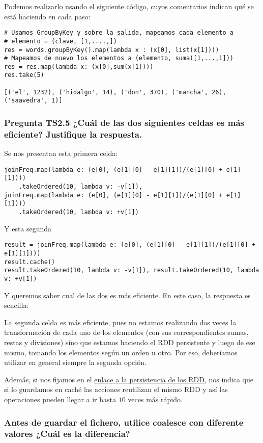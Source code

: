 \documentclass[11pt]{article}
\begin{document}
Podemos realizarlo usando el siguiente código, cuyos comentarios indican qué se está haciendo en cada paso:  

\begin{verbatim}
# Usamos GroupByKey y sobre la salida, mapeamos cada elemento a
# elemento = (clave, [1,....,])
res = words.groupByKey().map(lambda x : (x[0], list(x[1])))
# Mapeamos de nuevo los elementos a (elemento, suma([1,...,1]))
res = res.map(lambda x: (x[0],sum(x[1])))
res.take(5)

[('el', 1232), ('hidalgo', 14), ('don', 370), ('mancha', 26), ('saavedra', 1)]
\end{verbatim}


\subsubsection*{Pregunta TS2.5 ¿Cuál de las dos siguientes celdas es más eficiente? Justifique la respuesta.}

Se nos presentan esta primera celda: 
\begin{verbatim}
joinFreq.map(lambda e: (e[0], (e[1][0] - e[1][1])/(e[1][0] + e[1][1])))
    .takeOrdered(10, lambda v: -v[1]),
joinFreq.map(lambda e: (e[0], (e[1][0] - e[1][1])/(e[1][0] + e[1][1])))
    .takeOrdered(10, lambda v: +v[1])
\end{verbatim}
Y esta segunda
\begin{verbatim}
result = joinFreq.map(lambda e: (e[0], (e[1][0] - e[1][1])/(e[1][0] + e[1][1])))
result.cache()
result.takeOrdered(10, lambda v: -v[1]), result.takeOrdered(10, lambda v: +v[1])
\end{verbatim}
Y queremos saber cual de las dos es más eficiente. En este caso, la respuesta es sencilla: 

La segunda celda es más eficiente, pues no estamos realizando dos veces la transformación de cada uno de los elementos (con sus correspondientes sumas, restas y divisiones) sino que estamos haciendo el RDD persistente y luego de ese mismo, tomando los elementos según un orden u otro. Por eso, deberíamos utilizar en general siempre la segunda opción.

Además, si nos fijamos en el \href{https://spark.apache.org/docs/2.2.0/rdd-programming-guide.html#rdd-persistence}{enlace a la persistencia de los RDD}, nos indica que si lo guardamos en caché las acciones reutilizan el mismo RDD y así las operaciones pueden llegar a ir hasta $10$ veces más rápido.

\subsubsection*{Antes de guardar el fichero, utilice coalesce con diferente valores ¿Cuál es la diferencia?}
\end{document}

